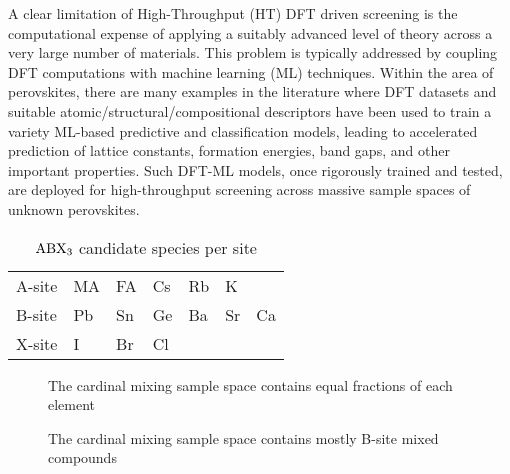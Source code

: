 A clear limitation of High-Throughput (HT) DFT driven screening is the computational expense of applying a suitably advanced level of theory across a very large number of materials.
This problem is typically addressed by coupling DFT computations with machine learning (ML) techniques.
Within the area of perovskites, there are many examples in the literature where DFT datasets and suitable atomic/structural/compositional descriptors have been used to train a variety ML-based predictive and classification models, leading to accelerated prediction of lattice constants, formation energies, band gaps, and other important properties.
\autocite{park-2019-explor-new,stanley-2020-machin-learn,lee-2021-discov-lead}
Such DFT-ML models, once rigorously trained and tested, are deployed for high-throughput screening across massive sample spaces of unknown perovskites.
\autocite{yang-2022-high-throug}

\begin{table}[htbp]
\caption{\label{tbl:site_tbl} \(\ce{ABX3}\) candidate species per site}
\centering
\begin{tabular}{l|llllll}
A-site & MA & FA & Cs & Rb & K & \\[0pt]
B-site & Pb & Sn & Ge & Ba & Sr & Ca\\[0pt]
X-site & I & Br & Cl &  &  & \\[0pt]
\end{tabular}
\end{table}

 
\begin{figure}[htbp]
\centering

\caption{\label{fig:domainstats} The cardinal mixing sample space contains equal fractions of each element}
\end{figure}

 
\begin{figure}[htbp]
\centering

\caption{\label{fig:domainmix} The cardinal mixing sample space contains mostly B-site mixed compounds}
\end{figure}

